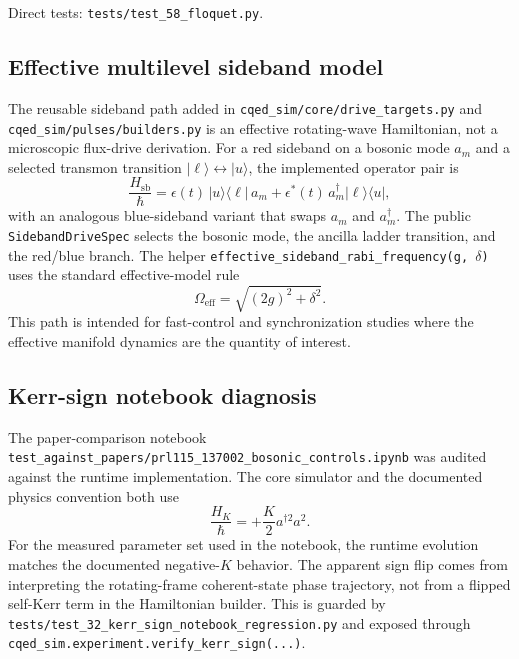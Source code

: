 \documentclass[11pt]{article}
\begin{document}
\noindent
Direct tests:
\texttt{tests/test\_58\_floquet.py}.

\subsection*{Effective multilevel sideband model}
The reusable sideband path added in \texttt{cqed\_sim/core/drive\_targets.py}
and \texttt{cqed\_sim/pulses/builders.py} is an effective rotating-wave
Hamiltonian, not a microscopic flux-drive derivation. For a red sideband on a
bosonic mode \(a_m\) and a selected transmon transition
\(|\ell\rangle \leftrightarrow |u\rangle\), the implemented operator pair is
\[
\frac{H_{\mathrm{sb}}}{\hbar}
=
\epsilon(t)\, |u\rangle\langle \ell|\, a_m
+
\epsilon^*(t)\, a_m^\dagger |\ell\rangle\langle u|,
\]
with an analogous blue-sideband variant that swaps \(a_m\) and \(a_m^\dagger\).
The public \texttt{SidebandDriveSpec} selects the bosonic mode, the ancilla ladder
transition, and the red/blue branch. The helper
\texttt{effective\_sideband\_rabi\_frequency(g, \(\delta\))} uses the standard
effective-model rule
\[
\Omega_{\mathrm{eff}} = \sqrt{(2g)^2 + \delta^2}.
\]
This path is intended for fast-control and synchronization studies where the
effective manifold dynamics are the quantity of interest.

\subsection*{Kerr-sign notebook diagnosis}
The paper-comparison notebook
\texttt{test\_against\_papers/prl115\_137002\_bosonic\_controls.ipynb} was
audited against the runtime implementation. The core simulator and the documented
physics convention both use
\[
\frac{H_K}{\hbar} = +\frac{K}{2} a^{\dagger 2} a^2.
\]
For the measured parameter set used in the notebook, the runtime evolution
matches the documented negative-\(K\) behavior. The apparent sign flip comes
from interpreting the rotating-frame coherent-state phase trajectory, not from
a flipped self-Kerr term in the Hamiltonian builder. This is guarded by
\texttt{tests/test\_32\_kerr\_sign\_notebook\_regression.py} and exposed through
\texttt{cqed\_sim.experiment.verify\_kerr\_sign(...)}.
\end{document}
